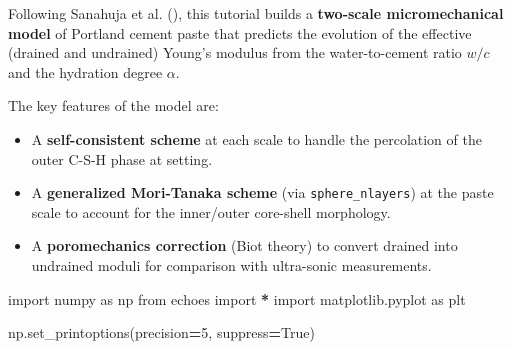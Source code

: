 \documentclass[
  a4paper,
  numbers=noendperiod,
  DIV=12]{scrreprt}
\newenvironment{Shaded}{\begin{snugshade}}{\end{snugshade}}
\newcommand{\DecValTok}[1]{\textcolor[rgb]{0.00,0.00,0.81}{#1}}
\newcommand{\ImportTok}[1]{#1}
\newcommand{\NormalTok}[1]{#1}
\newcommand{\OperatorTok}[1]{\textcolor[rgb]{0.81,0.36,0.00}{\textbf{#1}}}
\newcommand{\VariableTok}[1]{\textcolor[rgb]{0.00,0.00,0.00}{#1}}
\providecommand{\tightlist}{%
  \setlength{\itemsep}{0pt}\setlength{\parskip}{0pt}}
\begin{document}
\begin{tcolorbox}[enhanced jigsaw, arc=.35mm, bottomrule=.15mm, bottomtitle=1mm, breakable, colback=white, colbacktitle=quarto-callout-important-color!10!white, colframe=quarto-callout-important-color-frame, coltitle=black, left=2mm, leftrule=.75mm, opacityback=0, opacitybacktitle=0.6, rightrule=.15mm, title={Objectives}, titlerule=0mm, toprule=.15mm, toptitle=1mm]

Following Sanahuja et al. (), this
tutorial builds a \textbf{two-scale micromechanical model} of Portland
cement paste that predicts the evolution of the effective (drained and
undrained) Young's modulus from the water-to-cement ratio \(w/c\) and
the hydration degree \(\alpha\).

The key features of the model are:

\begin{itemize}
\tightlist
\item
  A \textbf{self-consistent scheme} at each scale to handle the
  percolation of the outer C-S-H phase at setting.
\item
  A \textbf{generalized Mori-Tanaka scheme} (via
  \texttt{sphere\_nlayers}) at the paste scale to account for the
  inner/outer core-shell morphology.
\item
  A \textbf{poromechanics correction} (Biot theory) to convert drained
  into undrained moduli for comparison with ultra-sonic measurements.
\end{itemize}

\end{tcolorbox}

\begin{tcolorbox}[enhanced jigsaw, arc=.35mm, bottomrule=.15mm, bottomtitle=1mm, breakable, colback=white, colbacktitle=quarto-callout-tip-color!10!white, colframe=quarto-callout-tip-color-frame, coltitle=black, left=2mm, leftrule=.75mm, opacityback=0, opacitybacktitle=0.6, rightrule=.15mm, title={Imports}, titlerule=0mm, toprule=.15mm, toptitle=1mm]

\begin{Shaded}
\begin{Highlighting}[]
\ImportTok{import}\NormalTok{ numpy }\ImportTok{as}\NormalTok{ np}
\ImportTok{from}\NormalTok{ echoes }\ImportTok{import} \OperatorTok{*}
\ImportTok{import}\NormalTok{ matplotlib.pyplot }\ImportTok{as}\NormalTok{ plt}

\NormalTok{np.set\_printoptions(precision}\OperatorTok{=}\DecValTok{5}\NormalTok{, suppress}\OperatorTok{=}\VariableTok{True}\NormalTok{)}
\end{Highlighting}
\end{Shaded}

\end{tcolorbox}
\end{document}
